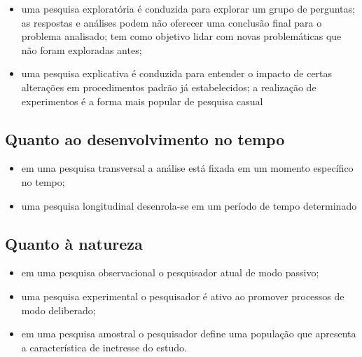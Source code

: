 \documentclass[
]{book}
\providecommand{\tightlist}{%
  \setlength{\itemsep}{0pt}\setlength{\parskip}{0pt}}
\begin{document}
\hfill\break

\begin{itemize}
\tightlist
\item
  uma pesquisa exploratória é conduzida para explorar um grupo de perguntas; as respostas e análises podem não oferecer uma conclusão final para o problema analisado; tem como objetivo lidar com novas problemáticas que não foram exploradas antes;\\
\item
  uma pesquisa explicativa é conduzida para entender o impacto de certas alterações em procedimentos padrão já estabelecidos; a realização de experimentos é a forma mais popular de pesquisa casual
\end{itemize}

\hfill\break

\hypertarget{quanto-ao-desenvolvimento-no-tempo}{%
\subsection{Quanto ao desenvolvimento no tempo}\label{quanto-ao-desenvolvimento-no-tempo}}

\hfill\break

\begin{itemize}
\tightlist
\item
  em uma pesquisa transversal a análise está fixada em um momento específico no tempo;\\
\item
  uma pesquisa longitudinal desenrola-se em um período de tempo determinado
\end{itemize}

\hfill\break

\hypertarget{quanto-uxe0-natureza}{%
\subsection{Quanto à natureza}\label{quanto-uxe0-natureza}}

\hfill\break

\begin{itemize}
\tightlist
\item
  em uma pesquisa observacional o pesquisador atual de modo passivo;\\
\item
  uma pesquisa experimental o pesquisador é ativo ao promover processos de modo deliberado;
\item
  em uma pesquisa amostral o pesquisador define uma população que apresenta a característica de inetresse do estudo.
\end{itemize}
\end{document}

